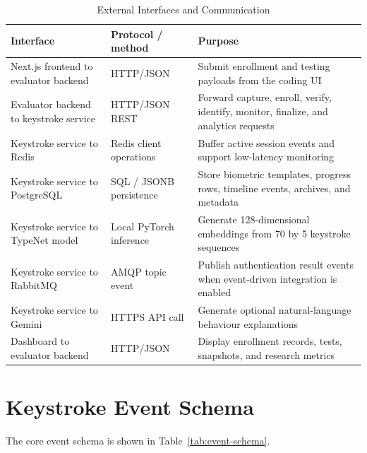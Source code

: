 \begin{table}[H]
  \centering
  \caption{External Interfaces and Communication}
  \label{tab:external-interfaces}
  \begin{singlespace}
  \begin{tabularx}{\textwidth}{@{}p{3.4cm}p{3.5cm}p{5.9cm}@{}}
    \toprule
    \textbf{Interface} & \textbf{Protocol / method} & \textbf{Purpose} \\
    \midrule
    Next.js frontend to evaluator backend & HTTP/JSON & Submit enrollment and testing payloads from the coding UI \\
    Evaluator backend to keystroke service & HTTP/JSON REST & Forward capture, enroll, verify, identify, monitor, finalize, and analytics requests \\
    Keystroke service to Redis & Redis client operations & Buffer active session events and support low-latency monitoring \\
    Keystroke service to PostgreSQL & SQL / JSONB persistence & Store biometric templates, progress rows, timeline events, archives, and metadata \\
    Keystroke service to TypeNet model & Local PyTorch inference & Generate 128-dimensional embeddings from 70 by 5 keystroke sequences \\
    Keystroke service to RabbitMQ & AMQP topic event & Publish authentication result events when event-driven integration is enabled \\
    Keystroke service to Gemini & HTTPS API call & Generate optional natural-language behaviour explanations \\
    Dashboard to evaluator backend & HTTP/JSON & Display enrollment records, tests, snapshots, and research metrics \\
    \bottomrule
  \end{tabularx}
  \end{singlespace}
\end{table}

\section{Keystroke Event Schema}
\label{sec:event-schema}

The core event schema is shown in Table~\ref{tab:event-schema}.


